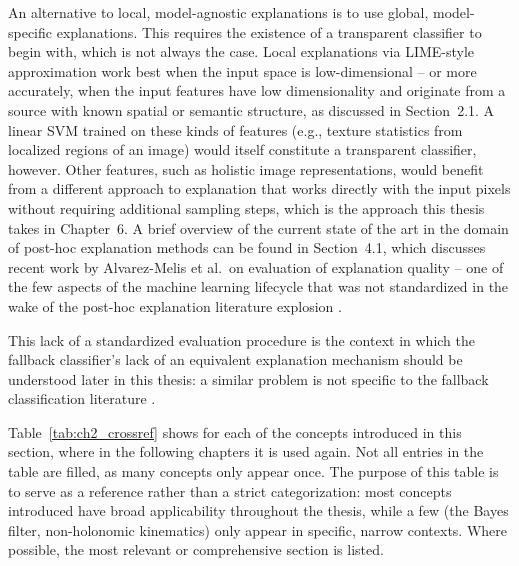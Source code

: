 An alternative to local, model-agnostic explanations is to use global, model-specific explanations. This requires the existence of a transparent classifier to begin with, which is not always the case. Local explanations via LIME-style approximation work best when the input space is low-dimensional -- or more accurately, when the input features have low dimensionality and originate from a source with known spatial or semantic structure, as discussed in Section~2.1. A linear SVM trained on these kinds of features (e.g., texture statistics from localized regions of an image) would itself constitute a transparent classifier, however. Other features, such as holistic image representations, would benefit from a different approach to explanation that works directly with the input pixels without requiring additional sampling steps, which is the approach this thesis takes in Chapter~6. A brief overview of the current state of the art in the domain of post-hoc explanation methods can be found in Section~4.1, which discusses recent work by Alvarez-Melis et al.\ on evaluation of explanation quality -- one of the few aspects of the machine learning lifecycle that was not standardized in the wake of the post-hoc explanation literature explosion \cite{saeed2023explainable}.

This lack of a standardized evaluation procedure is the context in which the fallback classifier's lack of an equivalent explanation mechanism should be understood later in this thesis: a similar problem is not specific to the fallback classification literature \cite{myllyaho2022misbehaviour}.

Table~\ref{tab:ch2_crossref} shows for each of the concepts introduced in this section, where in the following chapters it is used again. Not all entries in the table are filled, as many concepts only appear once. The purpose of this table is to serve as a reference rather than a strict categorization: most concepts introduced have broad applicability throughout the thesis, while a few (the Bayes filter, non-holonomic kinematics) only appear in specific, narrow contexts. Where possible, the most relevant or comprehensive section is listed.

\clearpage

